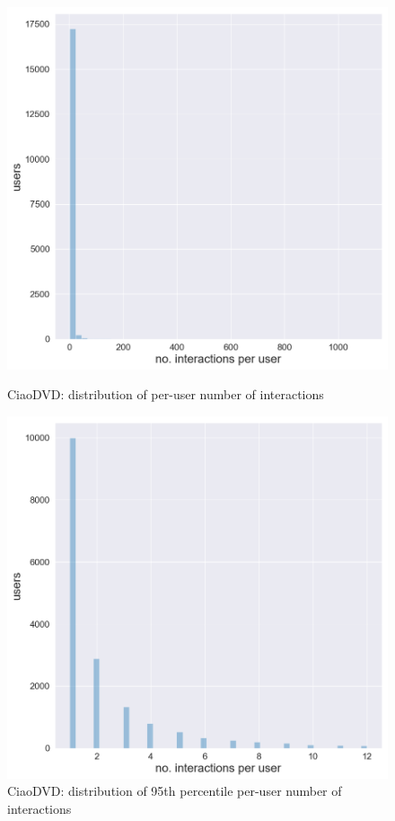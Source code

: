 \begin{figure}[htbp]
    \begin{minipage}{0.48\textwidth}
    \centering
      \includegraphics[width=\textwidth]{datasets/CiaoDVD_user_interaction_distr.png}
      \caption{CiaoDVD: distribution of per-user number of interactions}
      \label{fig:ciao_dist}
    \end{minipage}
    \hfill
    \begin{minipage}{0.48\textwidth}
    \centering
     \includegraphics[width=\textwidth]{datasets/CiaoDVD_95th_interaction_distr.png} 
     \caption{CiaoDVD: distribution of 95th percentile per-user number of interactions}
      \label{fig:ciao_dist_95}
    \end{minipage}
\end{figure}

